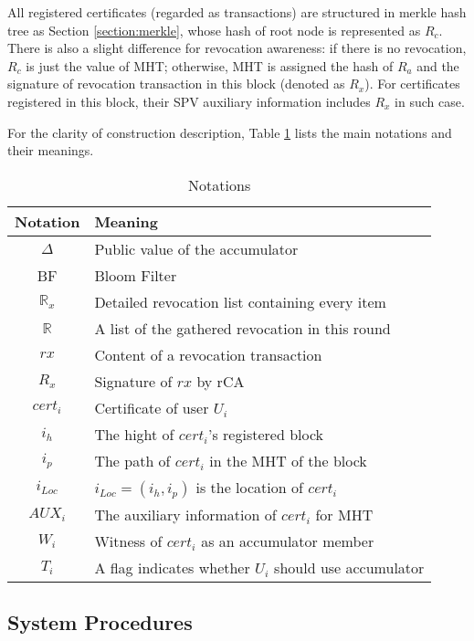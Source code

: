 \documentclass[conference]{IEEEtran}
\begin{document}
All registered certificates (regarded as transactions) are structured in merkle hash tree as Section \ref{section:merkle}, whose hash of root node is represented as $R_c$. There is also a slight difference for revocation awareness: if there is no revocation, $R_c$ is just the value of MHT; otherwise, MHT is assigned the hash of $R_a$ and the signature of revocation transaction in this block (denoted as $R_x$). For certificates registered in this block, their SPV auxiliary information includes $R_x$ in such case.

For the clarity of construction description, Table \ref{tab:notation} lists the main notations and their meanings.

\begin{table}[h]
	\caption{Notations}\label{tab:notation}
	\centering
	\begin{tabular}{c|l}
		\hline\hline
		Notation & Meaning \\\hline
		$\Delta$ & Public value of the accumulator\\
		BF & Bloom Filter\\
		$\mathbb{R}_x$ & Detailed revocation list containing every item\\
		$\mathbb{R}$ & A list of the gathered revocation in this round\\
		$rx$ & Content of a revocation transaction\\
		$R_x$ & Signature of $rx$ by rCA \\
		$cert_i$ & Certificate of user $U_i$\\
		$i_h$ & The hight of $cert_i$'s registered block \\
		$i_p$ & The path of $cert_i$ in the MHT of the block \\
		$i_{Loc}$ & $i_{Loc} = (i_h, i_p)$ is the location of $cert_i$ \\
		$AUX_i$ & The auxiliary information of $cert_i$ for MHT \\
		$W_i$ & Witness of $cert_i$ as an accumulator member \\
		$T_i$ & A flag indicates whether $U_i$ should use accumulator \\
		\hline
	\end{tabular}
\end{table}

\subsection{System Procedures}
\end{document}
